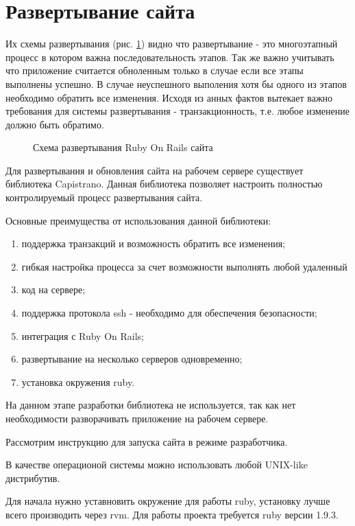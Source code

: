 \section{Развертывание сайта}
Их схемы развертывания (рис. \ref{ris:deployment_sait}) видно что развертывание - это
многоэтапный процесс в котором важна последовательность этапов. Так же важно учитывать что приложение
считается обноленным только в случае если все этапы выполнены успешно. В случае
неуспешного выполения хотя бы одного из этапов необходимо обратить все
изменения. Исходя из анных фактов вытекает важно требования для системы
развертывания - транзакционность, т.е. любое изменение должно быть обратимо.

\begin{figure}[h!]
\caption{Схема развертывания Ruby On Rails сайта}
\label{ris:deployment_sait}
\end{figure}

Для развертывания и обновления сайта на рабочем сервере существует библиотека
Capistrano. Данная библиотека позволяет настроить полностью контролируемый
процесс развертывания сайта.

Основные преимущества от использования данной библиотеки:
\begin{enumerate}
  \item поддержка транзакций и возможность обратить все изменения;
  \item гибкая настройка процесса за счет возможности выполнять любой удаленный
  \item код на сервере; 
  \item поддержка протокола ssh - необходимо для обеспечения безопасности; 
  \item интеграция с Ruby On Rails;
  \item развертывание на несколько серверов одновременно;
  \item установка окружения ruby.
\end{enumerate}

На данном этапе разработки библиотека не используется, так как нет необходимости
разворачивать приложение на рабочем сервере.

Рассмотрим инструкцию для запуска сайта в режиме разработчика.

В качестве операционой системы можно использовать любой UNIX-like дистрибутив.

Для начала нужно уставновить окружение для работы ruby, установку лучше всего
производить через rvm. Для работы проекта требуется ruby версии 1.9.3.

